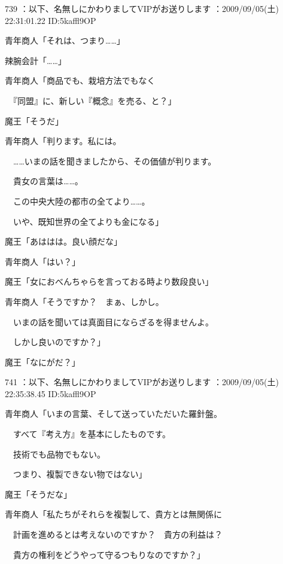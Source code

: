 \documentclass[a4j,twocolumn]{tarticle}
\begin{document}
	
    
    

739 ：以下、名無しにかわりましてVIPがお送りします ：2009/09/05(土) 22:31:01.22 ID:5kaffl9OP 


青年商人「それは、つまり……」\par{} 
辣腕会計「……」 



青年商人「商品でも、栽培方法でもなく\par{} 
　『同盟』に、新しい『概念』を売る、と？」 



魔王「そうだ」 



青年商人「判ります。私には。\par{} 
　……いまの話を聞きましたから、その価値が判ります。\par{} 
　貴女の言葉は……。 \par{}
　この中央大陸の都市の全てより……。\par{} 
　いや、既知世界の全てよりも金になる」 



魔王「あははは。良い顔だな」\par{} 
青年商人「はい？」 



魔王「女におべんちゃらを言っておる時より数段良い」 



青年商人「そうですか？　まぁ、しかし。\par{} 
　いまの話を聞いては真面目にならざるを得ませんよ。\par{} 
　しかし良いのですか？」 



魔王「なにがだ？」 

	
    
    

741 ：以下、名無しにかわりましてVIPがお送りします ：2009/09/05(土) 22:35:38.45 ID:5kaffl9OP 


青年商人「いまの言葉、そして送っていただいた羅針盤。\par{} 
　すべて『考え方』を基本にしたものです。\par{} 
　技術でも品物でもない。 \par{}
　つまり、複製できない物ではない」 



魔王「そうだな」 



青年商人「私たちがそれらを複製して、貴方とは無関係に\par{} 
　計画を進めるとは考えないのですか？　貴方の利益は？\par{} 
　貴方の権利をどうやって守るつもりなのですか？」 
\end{document}
